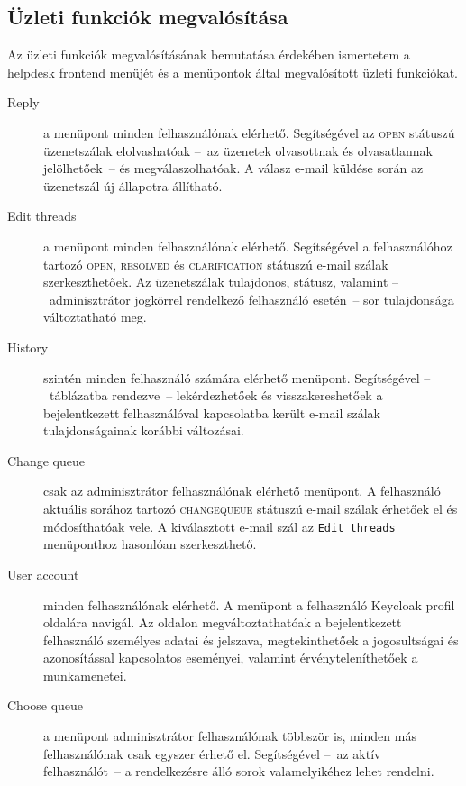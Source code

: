 \subsection{Üzleti funkciók megvalósítása}\label{sec:frontend_uzleti_funkciok}
Az üzleti funkciók megvalósításának bemutatása érdekében ismertetem a helpdesk frontend menüjét és a menüpontok által megvalósított üzleti funkciókat.
\begin{description}
	\item[Reply] a menüpont minden felhasználónak elérhető. Segítségével az \textsc{open} státuszú üzenetszálak elolvashatóak --~az üzenetek olvasottnak és olvasatlannak jelölhetőek~-- és megválaszolhatóak.
	A válasz e-mail küldése során az üzenetszál új állapotra állítható.
	
	\item[Edit threads] a menüpont minden felhasználónak elérhető. Segítségével a felhasználóhoz tartozó \textsc{open}, \textsc{resolved} és \textsc{clarification} státuszú e-mail szálak szerkeszthetőek. Az üzenetszálak tulajdonos, státusz, valamint --~adminisztrátor jogkörrel rendelkező felhasználó esetén~-- sor tulajdonsága változtatható meg.
	
	\item[History] szintén minden felhasználó számára elérhető menüpont. Segítségével --~táblázatba rendezve~-- lekérdezhetőek és visszakereshetőek a bejelentkezett felhasználóval kapcsolatba került e-mail szálak tulajdonságainak korábbi változásai.		
	
	\item[Change queue] csak az adminisztrátor felhasználónak elérhető menüpont. A felhasználó aktuális sorához tartozó \textsc{change\textunderscore queue} státuszú e-mail szálak érhetőek el és módosíthatóak vele. A kiválasztott e-mail szál az \texttt{Edit~threads} menüponthoz hasonlóan szerkeszthető.
	
	
	\item[User account] minden felhasználónak elérhető. A menüpont a felhasználó Keycloak profil oldalára navigál. Az oldalon megváltoztathatóak a bejelentkezett felhasználó személyes adatai és jelszava, megtekinthetőek a jogosultságai és azonosítással kapcsolatos eseményei, valamint érvényteleníthetőek a munkamenetei.
	
	\item[Choose queue] a menüpont adminisztrátor felhasználónak többször is, minden más felhasználónak csak egyszer érhető el. Segítségével --~az aktív felhasználót~-- a rendelkezésre álló sorok valamelyikéhez lehet rendelni.
	

\end{description}

